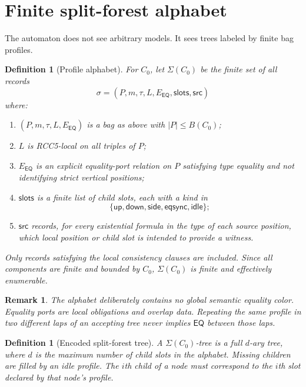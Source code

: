 \documentclass[11pt]{article}
\newtheorem{definition}[theorem]{Definition}
\newtheorem{remark}[theorem]{Remark}
\newcommand{\EQ}{\mathsf{EQ}}
\begin{document}
\section{Finite split-forest alphabet}\label{sec:alphabet}

The automaton does not see arbitrary models.  It sees trees labeled by finite bag profiles.

\begin{definition}[Profile alphabet]
For $C_0$, let $\Sigma(C_0)$ be the finite set of all records
\[
  \sigma=(P,m,\tau,L,E_{\EQ},\mathsf{slots},\mathsf{src})
\]
where:
\begin{enumerate}[label=(A\arabic*)]
\item $(P,m,\tau,L,E_{\EQ})$ is a bag as above with $|P|\le B(C_0)$;
\item $L$ is RCC5-local on all triples of $P$;
\item $E_{\EQ}$ is an explicit equality-port relation on $P$ satisfying type equality and not identifying strict vertical positions;
\item $\mathsf{slots}$ is a finite list of child slots, each with a kind in
\[
  \{\mathsf{up},\mathsf{down},\mathsf{side},\mathsf{eqsync},\mathsf{idle}\};
\]
\item $\mathsf{src}$ records, for every existential formula in the type of each source position, which local position or child slot is intended to provide a witness.
\end{enumerate}
Only records satisfying the local consistency clauses are included.  Since all components are finite and bounded by $C_0$, $\Sigma(C_0)$ is finite and effectively enumerable.
\end{definition}

\begin{remark}
The alphabet deliberately contains no global semantic equality color.  Equality ports are local obligations and overlap data.  Repeating the same profile in two different laps of an accepting tree never implies $\EQ$ between those laps.
\end{remark}

\begin{definition}[Encoded split-forest tree]
A $\Sigma(C_0)$-tree is a full $d$-ary tree, where $d$ is the maximum number of child slots in the alphabet.  Missing children are filled by an idle profile.  The $i$th child of a node must correspond to the $i$th slot declared by that node's profile.
\end{definition}
\end{document}
